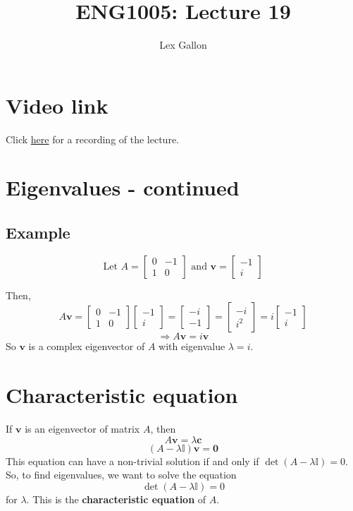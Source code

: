 \documentclass[11pt]{article}
\newcommand{\ident}{\mathbb{I}}
\renewcommand{\vec}[1]{\mathbf{#1}}
\begin{document}
\title{ENG1005: Lecture 19}
\author{Lex Gallon}
\maketitle

\tableofcontents

\section*{Video link}
Click \href{https://echo360.org.au/lesson/G_8402119b-734b-4e1e-a3b4-7e907e86ddba_b944cecf-8ba5-40d3-a870-0243a0a9e78c_2020-05-05T15:58:00.000_2020-05-05T16:53:00.000/classroom#sortDirection=desc}{here} for a recording of the lecture.

\section{Eigenvalues - continued}
\subsection{Example}
\[ 
\text{Let } A = \begin{bmatrix}
0 & -1 \\
1 & 0
\end{bmatrix}
\text{ and }
\vec{v} = \begin{bmatrix}
-1 \\
i
\end{bmatrix}
\]

Then,
\[ 
A\vec{v} = 
\begin{bmatrix}
0 & -1 \\
1 & 0
\end{bmatrix}
\begin{bmatrix}
-1 \\
i
\end{bmatrix}
= \begin{bmatrix}
-i \\
-1
\end{bmatrix}
= \begin{bmatrix}
-i \\
i^2
\end{bmatrix}
= i \begin{bmatrix}
-1 \\
i
\end{bmatrix}
\]
\[ 
\Rightarrow A\vec{v} = i\vec{v}
\]
So $\vec{v}$ is a complex eigenvector of $A$ with eigenvalue $\lambda = i$.

\section{Characteristic equation}
If $\vec{v}$ is an eigenvector of matrix $A$, then
\[ A \vec{v} = \lambda \vec{c} \]
\[ (A - \lambda \mathbb{I})\vec{v} = \vec{0} \]
This equation can have a non-trivial solution if and only if $\det(A - \lambda \mathbb{I})=0$.
So, to find eigenvalues, we want to solve the equation
\[ \det(A - \lambda \ident)=0 \]
for $\lambda$. This is the \textbf{characteristic equation} of $A$.
\end{document}
